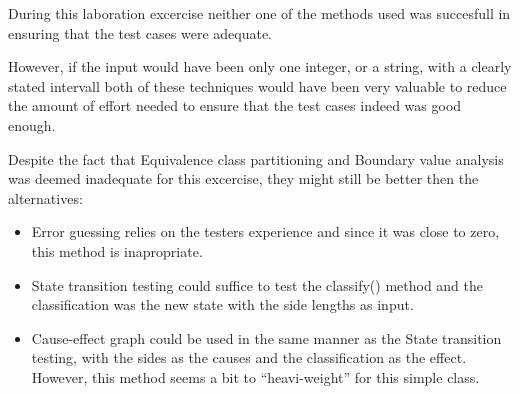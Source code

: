 During this laboration excercise neither one of the methods used was succesfull in ensuring that the test cases were adequate.

However, if the input would have been only one integer, or a string, with a clearly stated intervall both of these techniques would have been very valuable to reduce the amount of effort needed to ensure that the test cases indeed was good enough.


Despite the fact that Equivalence class partitioning and Boundary value analysis was deemed inadequate for this excercise, they might still be better then the alternatives:
\begin{itemize}
\item Error guessing relies on the testers experience and since it was close to zero, this method is inapropriate.
\item State transition testing could suffice to test the classify() method and the classification was the new state with the side lengths as input.
\item Cause-effect graph could be used in the same manner as the State transition testing, with the sides as the causes and the classification as the effect. However, this method seems a bit to "`heavi-weight"' for this simple class.
\end{itemize}
